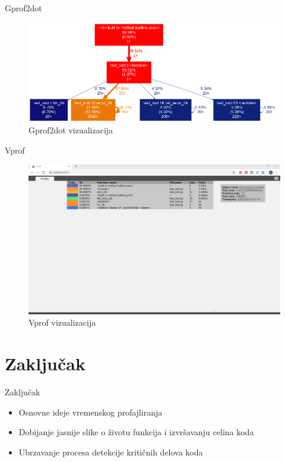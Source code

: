 \documentclass{beamer}
\begin{document}
\begin{frame}{Gprof2dot}
\begin{figure}[h!]
\begin{center}
\includegraphics[scale=0.37]{MVJ_02_ProfajleriZaPython_ZecevicSmiljanicMilovanovicPopov/gprof2dot.png}
\end{center}
\caption{Gprof2dot vizualizacija}
\label{fig:gprof2dot_1}
\end{figure}
\end{frame}

\begin{frame}{Vprof}
\begin{figure}[h!]
\begin{center}
\includegraphics[trim={0cm 20cm 0cm 0cm},clip,scale=0.21]{MVJ_02_ProfajleriZaPython_ZecevicSmiljanicMilovanovicPopov/vprof.png}
\end{center}
\caption{Vprof vizualizacija}
\label{fig:vprof_1}
\end{figure}
\end{frame}

\section{Zaključak}
\begin{frame}{Zaključak}
\begin{itemize}
    \item Osnovne ideje vremenskog profajliranja
    \item Dobijanje jasnije slike o životu funkcija i izvršavanju celina koda
    \item Ubrzavanje procesa detekcije kritičnih delova koda
\end{itemize}
\end{frame}
\end{document}
